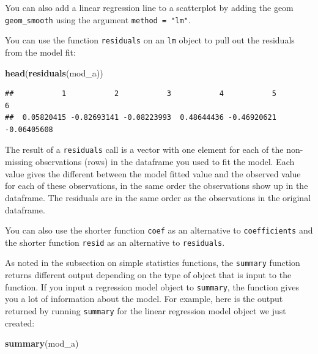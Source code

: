 \documentclass[]{book}
\makeatletter
\newenvironment{Shaded}{\begin{snugshade}}{\end{snugshade}}
\newcommand{\KeywordTok}[1]{\textcolor[rgb]{0.13,0.29,0.53}{\textbf{#1}}}
\newcommand{\NormalTok}[1]{#1}
\newenvironment{kframe}{%
\medskip{}
\setlength{\fboxsep}{.8em}
 \def\at@end@of@kframe{}%
 \ifinner\ifhmode%
  \def\at@end@of@kframe{\end{minipage}}%
  \begin{minipage}{\columnwidth}%
 \fi\fi%
 \def\FrameCommand##1{\hskip\@totalleftmargin \hskip-\fboxsep
 \colorbox{shadecolor}{##1}\hskip-\fboxsep
     \hskip-\linewidth \hskip-\@totalleftmargin \hskip\columnwidth}%
 \MakeFramed {\advance\hsize-\width
   \@totalleftmargin\z@ \linewidth\hsize
   \@setminipage}}%
 {\par\unskip\endMakeFramed%
 \at@end@of@kframe}
\renewenvironment{Shaded}{\begin{kframe}}{\end{kframe}}
\newenvironment{rmdblock}[1]
  {
  \begin{itemize}
  \renewcommand{\labelitemi}{
    \raisebox{-.7\height}[0pt][0pt]{
      {\setkeys{Gin}{width=3em,keepaspectratio}\texttt{[image: images/\#1]}}
    }
  }
  \setlength{\fboxsep}{1em}
  \begin{kframe}
  \item
  }
  {
  \end{kframe}
  \end{itemize}
  }
\newenvironment{rmdnote}
  {\begin{rmdblock}{note}}
  {\end{rmdblock}}
\newenvironment{rmdtip}
  {\begin{rmdblock}{tip}}
  {\end{rmdblock}}
\theoremstyle{definition}
\theoremstyle{definition}
\theoremstyle{definition}
\theoremstyle{remark}
\makeatother
\begin{document}
\begin{rmdnote}
You can also add a linear regression line to a scatterplot by adding the
geom \texttt{geom\_smooth} using the argument \texttt{method\ =\ "lm"}.
\end{rmdnote}

You can use the function \texttt{residuals} on an \texttt{lm} object to
pull out the residuals from the model fit:

\begin{Shaded}
\begin{Highlighting}[]
\KeywordTok{head}\NormalTok{(}\KeywordTok{residuals}\NormalTok{(mod_a))}
\end{Highlighting}
\end{Shaded}

\begin{verbatim}
##           1           2           3           4           5           6 
##  0.05820415 -0.82693141 -0.08223993  0.48644436 -0.46920621 -0.06405608
\end{verbatim}

The result of a \texttt{residuals} call is a vector with one element for
each of the non-missing observations (rows) in the dataframe you used to
fit the model. Each value gives the different between the model fitted
value and the observed value for each of these observations, in the same
order the observations show up in the dataframe. The residuals are in
the same order as the observations in the original dataframe.

\begin{rmdtip}
You can also use the shorter function \texttt{coef} as an alternative to
\texttt{coefficients} and the shorter function \texttt{resid} as an
alternative to \texttt{residuals}.
\end{rmdtip}

As noted in the subsection on simple statistics functions, the
\texttt{summary} function returns different output depending on the type
of object that is input to the function. If you input a regression model
object to \texttt{summary}, the function gives you a lot of information
about the model. For example, here is the output returned by running
\texttt{summary} for the linear regression model object we just created:

\begin{Shaded}
\begin{Highlighting}[]
\KeywordTok{summary}\NormalTok{(mod_a)}
\end{Highlighting}
\end{Shaded}
\end{document}
